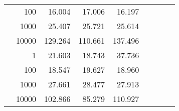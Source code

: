 \begin{table}
\begin{tabular}{rrrrrrrrr}
	            
					 &  
					 
					\multirow{ 1 }{*}{ 100 } &
					
						
							    
							    
	                           16.004 & 17.006 & 16.197  \\
	                
	            
					 &  
					 
					\multirow{ 1 }{*}{ 1000 } &
					
						
							    
							    
	                           25.407 & 25.721 & 25.614  \\
	                
	            
					 &  
					 
					\multirow{ 1 }{*}{ 10000 } &
					
						
							    
							    
	                           129.264 & 110.661 & 137.496  \\
	                
	            
	        
				\noalign{\smallskip}\hline
				\multirow{ 4 }{*}{ 2000000 } &
				
					
					 
					\multirow{ 1 }{*}{ 1 } &
					
						
							    
							    
	                           21.603 & 18.743 & 37.736  \\
	                
	            
					 &  
					 
					\multirow{ 1 }{*}{ 100 } &
					
						
							    
							    
	                           18.547 & 19.627 & 18.960  \\
	                
	            
					 &  
					 
					\multirow{ 1 }{*}{ 1000 } &
					
						
							    
							    
	                           27.661 & 28.477 & 27.913  \\
	                
	            
					 &  
					 
					\multirow{ 1 }{*}{ 10000 } &
					
						
							    
							    
	                           102.866 & 85.279 & 110.927  \\
	                
	            
	        

\hline

\end{tabular}
\end{table}
\clearpage



